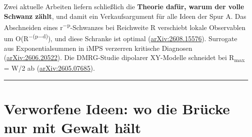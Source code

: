 Zwei aktuelle Arbeiten liefern schließlich die \textbf{Theorie dafür, warum der volle Schwanz zählt}, und damit ein Verkaufsargument für alle Ideen der Spur A. Das Abschneiden eines r\textsuperscript{−p}-Schwanzes bei Reichweite R verschiebt lokale Observablen um O(R\textsuperscript{−(p−d)}), und diese Schranke ist optimal (\href{https://arxiv.org/abs/2608.15576}{arXiv:2608.15576}). Surrogate aus Exponentialsummen in iMPS verzerren kritische Diagnosen (\href{https://arxiv.org/abs/2606.20522}{arXiv:2606.20522}). Die DMRG-Studie dipolarer XY-Modelle schneidet bei R\textsubscript{max} = W/2 ab (\href{https://arxiv.org/html/2605.07685}{arXiv:2605.07685}).

\begin{center}\rule{0.5\linewidth}{0.5pt}\end{center}

\section{Verworfene Ideen: wo die Brücke nur mit Gewalt hält}

